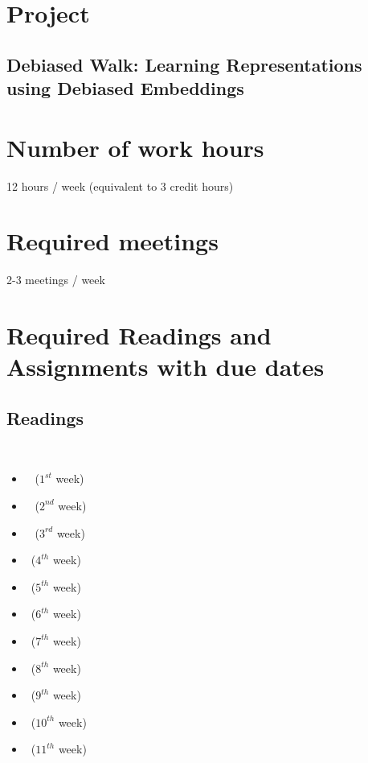 \documentclass{article}
\title{\mathbf{Independent Study Project Proposal}}
\author{{Ashutosh Tiwari (ashutiwa@iu.edu)}}
\begin{document}
\maketitle

\section{Project}

\subsection{Debiased Walk: Learning Representations using Debiased Embeddings} \label{project_name}

\section{Number of work hours}
12 hours / week (equivalent to 3 credit hours)

\section{Required meetings}
2-3  meetings / week

\section{Required Readings and Assignments with due dates}
\subsection{Readings} ~\label{readings}
\begin{itemize}
    \item ~\cite{khajehnejad_crosswalk_2021} ($1^{st}$ week)
    \item ~\cite{rahman_fairwalk_2019} ($2^{nd}$ week)
    \item ~\cite{laclau_all_2021} ($3^{rd}$ week)
    \item ~\cite{gonen_lipstick_2019}($4^{th}$ week)
    \item ~\cite{bolukbasi_man_2016}($5^{th}$ week)
    \item ~\cite{DBLP:journals/corr/PerozziAS14}($6^{th}$ week)
    \item ~\cite{ravfogel_null_2020}($7^{th}$ week)
    \item ~\cite{garg_word_2018}($8^{th}$ week)
    \item ~\cite{kojaku_residual2vec_2021}($9^{th}$ week)
    \item ~\cite{brunet_understanding_2019}($10^{th}$ week)
    \item ~\cite{kenna_using_2021}($11^{th}$ week)
    
\end{itemize}
\end{document}
